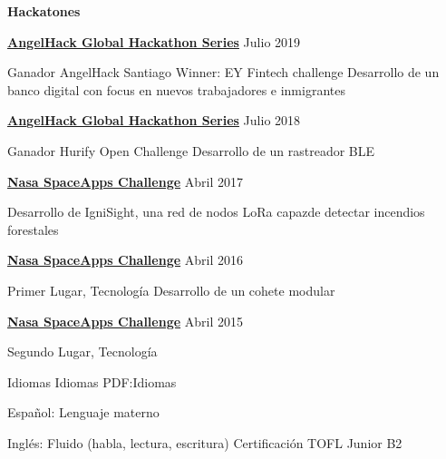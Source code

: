 \documentclass[letterpaper,yyyy,draft]{simpleresumecv}
\begin{document}
\begin{Body}
{    \BigGap
    \BulletItem
    \textbf{Hackatones}
    {
        {
            \Gap
            \SubBulletItem
            \href{https://angelhack.com}{\textbf{AngelHack Global Hackathon Series}}
            \hfill
            Julio 2019
            \begin{Detail}
            \SubItem
            Ganador AngelHack Santiago Winner: EY Fintech challenge\newline
            Desarrollo de un banco digital con focus \newline en nuevos trabajadores e inmigrantes
            \end{Detail}
        }

        {
            \BigGap
            \SubBulletItem
            \href{https://angelhack.com}{\textbf{AngelHack Global Hackathon Series}}
            \hfill
            Julio 2018
            \begin{Detail}
            \SubItem
            Ganador Hurify Open Challenge\newline
            Desarrollo de un rastreador BLE
            \end{Detail}
        }

        {
            \BigGap
            \SubBulletItem
            \href{https://spaceappschallenge.org}{\textbf{Nasa SpaceApps Challenge}}
            \hfill
            Abril 2017
            \begin{Detail}
            \SubItem
            Desarrollo de IgniSight, una red de nodos LoRa capaz\newline de detectar incendios forestales
            \end{Detail}
        }

        {
            \BigGap
            \SubBulletItem
            \href{https://spaceappschallenge.org}{\textbf{Nasa SpaceApps Challenge}}
            \hfill
            Abril 2016
            \begin{Detail}
            \SubItem
            Primer Lugar, Tecnología\newline
            Desarrollo de un cohete modular
            \end{Detail}
        }

        {
            \BigGap
            \SubBulletItem
            \href{https://spaceappschallenge.org}{\textbf{Nasa SpaceApps Challenge}}
            \hfill
            Abril 2015
            \begin{Detail}
            \SubItem
            Segundo Lugar, Tecnología
            \end{Detail}
        }
    }
}


\Section
{Idiomas}
{Idiomas}
{PDF:Idiomas}
{
    {
        \BulletItem
        Español: Lenguaje materno
    }

    \Gap

    {
        \BulletItem
        Inglés: Fluido (habla, lectura, escritura)
        \SubBulletItem
        Certificación TOFL Junior B2
    }
}
\end{Body}
\end{document}

